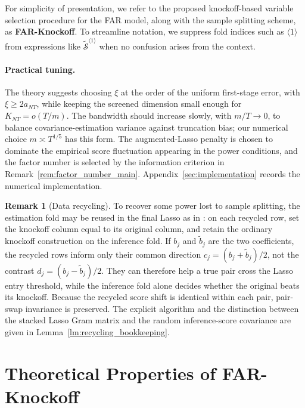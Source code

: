 ﻿\documentclass[12pt]{article}
\newcommand{\0}{\mbox{\bf 0}}
\theoremstyle{plain}%
\newtheorem{remark}{Remark}
\theoremstyle{definition}
\newtheorem{remark}[theorem]{Remark}
\begin{document}
{For simplicity of presentation, we refer to the proposed knockoff-based variable selection procedure for the FAR model, along with the sample splitting scheme, as \textbf{FAR-Knockoff}. To streamline notation, we suppress fold indices such as $\langle 1 \rangle$ from expressions like $\widetilde{\mathcal{S}}^{\langle 1 \rangle}$ when no confusion arises from the context.

{\color{minorrevisionred}
\paragraph{Practical tuning.}
The theory suggests choosing $\xi$ at the order of the uniform first-stage
error, with $\xi\geq2a_{NT}$, while keeping the screened dimension small enough
for $K_{NT}=o(T/m)$. The bandwidth should increase slowly, with $m/T\to0$, to
balance covariance-estimation variance against truncation bias; our numerical
choice $m\asymp T^{1/5}$ has this form. The augmented-Lasso penalty is chosen to
dominate the empirical score fluctuation appearing in the power conditions,
and the factor number is selected by the information criterion in
Remark~\ref{rem:factor_number_main}. Appendix~\ref{sec:implementation} records
the numerical implementation.
}

{\color{red}
\begin{remark}[Data recycling]
\label{rem:recycling_main}
To recover some power lost to sample splitting, the estimation fold may be
reused in the final Lasso as in \citet{BarberCandes2019}: on each recycled
row, set the knockoff column equal to its original column, and retain the
ordinary knockoff construction on the inference fold.  If $b_j$ and
$\widetilde b_j$ are the two coefficients, the recycled rows inform only
their common direction $c_j=(b_j+\widetilde b_j)/2$, not the contrast
$d_j=(b_j-\widetilde b_j)/2$.  They can therefore help a true pair cross
the Lasso entry threshold, while the inference fold alone decides whether
the original beats its knockoff.  Because the recycled score shift is
identical within each pair, pair-swap invariance is preserved.  The
explicit algorithm and the distinction between the stacked Lasso Gram
matrix and the random inference-score covariance are given in
Lemma~\ref{lm:recycling_bookkeeping}.
\end{remark}
}





\section{Theoretical Properties of FAR-Knockoff}
\label{sec:FDR_power}

}
\end{document}
